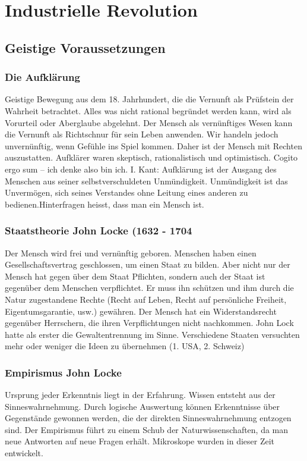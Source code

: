 \documentclass[10pt, openright=true]{scrartcl}
\begin{document}
\section{Industrielle Revolution}
\subsection{Geistige Voraussetzungen}
\subsubsection{Die Aufklärung}
Geistige Bewegung aus dem 18. Jahrhundert, die die Vernunft als Prüfstein der Wahrheit betrachtet. Alles was nicht rational begründet werden kann, wird als Vorurteil oder Aberglaube abgelehnt. Der Mensch als vernünftiges Wesen kann die Vernunft als Richtschnur für sein Leben anwenden. Wir handeln jedoch unvernünftig, wenn Gefühle ins Spiel kommen. Daher ist der Mensch mit Rechten auszustatten. Aufklärer waren skeptisch, rationalistisch und optimistisch. \glqq Cogito ergo sum \grqq – ich denke also bin ich. I. Kant: \glqq Aufklärung ist der Ausgang des Menschen aus seiner selbstverschuldeten Unmündigkeit. Unmündigkeit ist das Unvermögen, sich seines Verstandes ohne Leitung eines anderen zu bedienen.\grqq  Hinterfragen heisst, dass man ein Mensch ist. 
\subsubsection{Staatstheorie John Locke (1632 - 1704}
Der Mensch wird frei und vernünftig geboren. Menschen haben einen Gesellschaftsvertrag geschlossen, um einen Staat zu bilden. Aber nicht nur der Mensch hat gegen über dem Staat Pflichten, sondern auch der Staat ist gegenüber dem Menschen verpflichtet. Er muss ihn schützen und ihm durch die Natur zugestandene Rechte (Recht auf Leben, Recht auf persönliche Freiheit, Eigentumsgarantie, usw.) gewähren. Der Mensch hat ein Widerstandsrecht gegenüber Herrschern, die ihren Verpflichtungen nicht nachkommen. John Lock hatte als erster die Gewaltentrennung im Sinne. Verschiedene Staaten versuchten mehr oder weniger die Ideen zu übernehmen (1. USA, 2. Schweiz)
\subsubsection{Empirismus John Locke}
Ursprung jeder Erkenntnis liegt in der Erfahrung. Wissen entsteht aus der Sinneswahrnehmung. Durch logische Auswertung können Erkenntnisse über Gegenstände gewonnen werden, die der direkten Sinneswahrnehmung entzogen sind. Der Empirismus führt zu einem Schub der Naturwissenschaften, da man neue Antworten auf neue Fragen erhält. Mikroskope wurden in dieser Zeit entwickelt.
\end{document}
